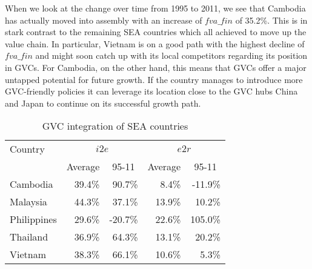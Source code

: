 \documentclass[11pt,a4paper]{article}
\begin{document}
When we look at the change over time from 1995 to 2011, we see that Cambodia has actually moved into assembly with an increase of $fva\_fin$ of 35.2\%. This is in stark contrast to the remaining SEA countries which all achieved to move up the value chain. In particular, Vietnam is on a good path with the highest decline of $fva\_fin$ and might soon catch up with its local competitors regarding its position in GVCs. For Cambodia, on the other hand, this means that GVCs offer a major untapped potential for future growth. If the country manages to introduce more GVC-friendly policies it can leverage its location close to the GVC hubs China and Japan to continue on its successful growth path.\\

\begin{table}[!h]\small
  \centering
  \caption{GVC integration of SEA countries}
    \begin{tabular}{lrrrr}
    \toprule
    Country & \multicolumn{2}{c}{\multirow{1}[0]{*}{$i2e$}} & \multicolumn{2}{c}{\multirow{1}[0]{*}{$e2r$}} \\
    \multicolumn{1}{c}{} & \multicolumn{1}{c}{Average} & \multicolumn{1}{c}{95-11} & \multicolumn{1}{c}{Average} & \multicolumn{1}{c}{95-11} \\
    \midrule
    Cambodia & 39.4\% & 90.7\% & 8.4\% & -11.9\% \\
    Malaysia & 44.3\% & 37.1\% & 13.9\% & 10.2\% \\
    Philippines & 29.6\% & -20.7\% & 22.6\% & 105.0\% \\
    Thailand & 36.9\% & 64.3\% & 13.1\% & 20.2\% \\
    Vietnam & 38.3\% & 66.1\% & 10.6\% & 5.3\% \\
    \bottomrule
    \end{tabular}
  \label{tab:seagvc}
\end{table}
\end{document}

